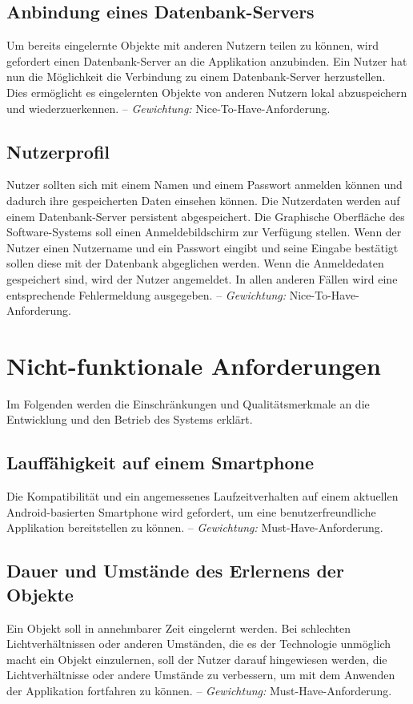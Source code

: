 \documentclass[oneside]{ausarbeitung}
\begin{document}
\subsection{Anbindung eines Datenbank-Servers}
Um bereits eingelernte Objekte mit anderen Nutzern teilen zu können, wird gefordert einen Datenbank-Server an die Applikation anzubinden. Ein Nutzer hat nun die Möglichkeit die Verbindung zu einem Datenbank-Server herzustellen. Dies ermöglicht es eingelernten Objekte von anderen Nutzern lokal abzuspeichern und wiederzuerkennen. -- \textit{Gewichtung:} Nice-To-Have-Anforderung.
\subsection{Nutzerprofil}
Nutzer sollten sich mit einem Namen und einem Passwort anmelden können und dadurch ihre gespeicherten Daten einsehen können. Die Nutzerdaten werden auf einem Datenbank-Server persistent abgespeichert. Die Graphische Oberfläche des Software-Systems soll einen Anmeldebildschirm zur Verfügung stellen. Wenn der Nutzer einen Nutzername und ein Passwort eingibt und seine Eingabe bestätigt sollen diese mit der Datenbank abgeglichen werden. Wenn die Anmeldedaten gespeichert sind, wird der Nutzer angemeldet. In allen anderen Fällen wird eine entsprechende Fehlermeldung ausgegeben. -- \textit{Gewichtung:} Nice-To-Have-Anforderung.
%
\section{Nicht-funktionale Anforderungen}
Im Folgenden werden die Einschränkungen und Qualitätsmerkmale an die Entwicklung und den Betrieb des Systems erklärt.

\subsection{Lauffähigkeit auf einem Smartphone}
Die Kompatibilität und ein angemessenes Laufzeitverhalten auf einem aktuellen Android-basierten Smartphone wird gefordert, um eine benutzerfreundliche Applikation bereitstellen zu können. -- \textit{Gewichtung:} Must-Have-Anforderung.

\subsection{Dauer und Umstände des Erlernens der Objekte}
Ein Objekt soll in annehmbarer Zeit eingelernt werden. Bei schlechten Lichtverhältnissen oder anderen Umständen, die es der Technologie unmöglich macht ein Objekt einzulernen, soll der Nutzer darauf hingewiesen werden, die Lichtverhältnisse oder andere Umstände zu verbessern, um mit dem Anwenden der Applikation fortfahren zu können. -- \textit{Gewichtung:} Must-Have-Anforderung.
\end{document}
